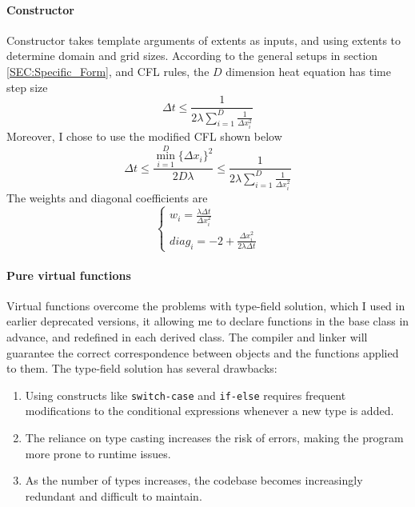 \paragraph{Constructor} 
Constructor takes template arguments of extents as inputs, and using extents to determine domain and grid sizes.
According to the general setups in section \ref{SEC:Specific_Form}, and CFL rules, the $D$ dimension heat equation has time step size
\begin{equation}
  \Delta t \leqslant \frac{1}{ 2 \lambda 
    \sum_{i=1}^{D} \frac{1}{\Delta x_i ^2}
  }
\end{equation}
Moreover, I chose to use the modified 
                                          CFL \cite{CFL} 
shown below 
\begin{equation}
  \Delta t 
  \leqslant 
  \frac{\min_{i=1}^{D} \{\Delta x_i\}^2}{2 D\lambda}
  \leqslant 
  \frac{1}{ 2 \lambda 
    \sum_{i=1}^{D} \frac{1}{\Delta x_i ^2}}
\end{equation}
The weights and diagonal coefficients are 
\begin{equation}
  \begin{cases}
    w_i = \frac{\lambda \Delta t}{\Delta x_i^2}               \\
    diag_i = -2 + \frac{\Delta x_i^2}{2\lambda\Delta t}
  \end{cases}
\end{equation}

\paragraph{Pure virtual functions}
Virtual functions overcome the problems with type-field solution, which I used in earlier deprecated versions, 
it allowing me to declare functions in the base class in advance, and redefined in each derived class.
The compiler and linker will guarantee the correct correspondence between objects and the functions applied to them.
The type-field solution has several drawbacks:
\begin{enumerate}
  \item Using constructs like \texttt{switch-case} and \texttt{if-else} requires frequent modifications to the conditional expressions whenever a new type is added.
  \item The reliance on type casting increases the risk of errors, making the program more prone to runtime issues.
  \item As the number of types increases, the codebase becomes increasingly redundant and difficult to maintain.
\end{enumerate}

